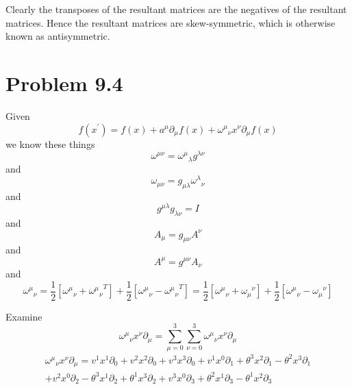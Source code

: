 \documentclass{article}
\begin{document}
Clearly the transposes of the resultant matrices are the negatives of the resultant matrices. Hence the resultant matrices are skew-symmetric, which is otherwise known as antisymmetric.


 
\section*{Problem 9.4}

Given \[ f(x^\prime) = f(x)+a^\mu \partial_\mu f(x)+{\omega^\mu}_\nu x^\nu \partial_\mu f(x)\] we know these things \[\omega^{\mu\nu}={\omega^\mu}_\lambda g^{\lambda\nu} \] and \[\omega_{\mu\nu}= g_{\mu\lambda} {\omega^\lambda}_\nu \] and \[g^{\mu\lambda}g_{\lambda\nu} = I\] and \[A_\mu=g_{\mu\nu}A^\nu\] and \[A^\mu=g^{\mu\nu}A_\nu\] and \[{\omega^\mu}_\nu=\frac{1}{2}[{\omega^\mu}_\nu+{{\omega^\mu}_\nu}^T]+\frac{1}{2}[{\omega^\mu}_\nu-{{\omega^\mu}_\nu}^T]=\frac{1}{2}[{\omega^\mu}_\nu+{\omega_\mu}^\nu]+\frac{1}{2}[{\omega^\mu}_\nu-{\omega_\mu}^\nu]\]

Examine \[{\omega^\mu}_\nu x^\nu \partial_\mu=\sum^3_{\mu=0}\sum^3_{\nu=0}{\omega^\mu}_\nu x^\nu \partial_\mu\]
\begin{multline*}
{\omega^\mu}_\nu x^\nu \partial_\mu=
v^1 x^1 \partial_0+v^2 x^2 \partial_0+v^3 x^3 \partial_0+
v^1 x^0 \partial_1+\theta^3 x^2 \partial_1-\theta^2 x^3 \partial_1\\+ 
v^2 x^0 \partial_2-\theta^3 x^1 \partial_2+\theta^1 x^3 \partial_2+
v^3 x^0 \partial_3+\theta^2 x^1 \partial_3-\theta^1 x^2 \partial_3
\end{multline*}
\end{document}
